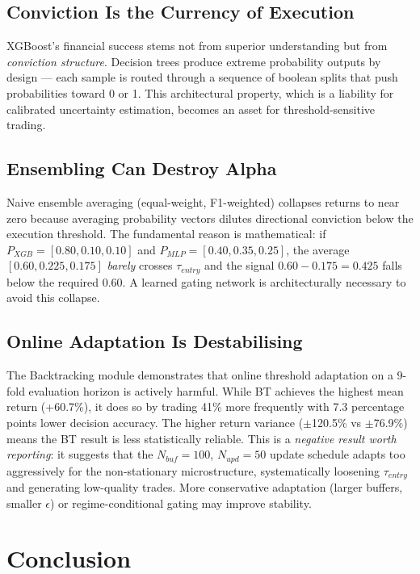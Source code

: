 \documentclass[conference]{IEEEtran}
\begin{document}
\subsection{Conviction Is the Currency of Execution}
XGBoost's financial success stems not from superior understanding but from
\textit{conviction structure}. Decision trees produce extreme probability
outputs by design --- each sample is routed through a sequence of boolean
splits that push probabilities toward 0 or 1. This architectural property,
which is a liability for calibrated uncertainty estimation, becomes an
asset for threshold-sensitive trading.

\subsection{Ensembling Can Destroy Alpha}
Naive ensemble averaging (equal-weight, F1-weighted) collapses returns to
near zero because averaging probability vectors dilutes directional
conviction below the execution threshold. The fundamental reason is mathematical:
if $P_{XGB} = [0.80, 0.10, 0.10]$ and $P_{MLP} = [0.40, 0.35, 0.25]$,
the average $[0.60, 0.225, 0.175]$ \textit{barely} crosses $\tau_{entry}$
and the signal $0.60 - 0.175 = 0.425$ falls below the required 0.60.
A learned gating network is architecturally necessary to avoid this collapse.

\subsection{Online Adaptation Is Destabilising}
The Backtracking module demonstrates that online threshold adaptation on
a 9-fold evaluation horizon is actively harmful. While BT achieves the
highest mean return (+60.7\%), it does so by trading 41\% more
frequently with 7.3 percentage points lower decision accuracy. The
higher return variance ($\pm$120.5\% vs $\pm$76.9\%) means the BT result
is less statistically reliable. This is a \textit{negative result worth
reporting}: it suggests that the $N_{buf}=100$, $N_{upd}=50$ update
schedule adapts too aggressively for the non-stationary microstructure,
systematically loosening $\tau_{entry}$ and generating low-quality
trades. More conservative adaptation (larger buffers, smaller $\epsilon$)
or regime-conditional gating may improve stability.

\section{Conclusion}
\end{document}
